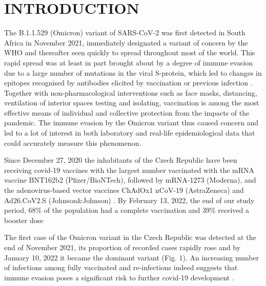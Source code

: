 \documentclass[a4paper,12pt]{article}
\def\figdiscrim{1}
\begin{document}
\section*{INTRODUCTION}
\label{sec1}

\doublespacing


The B.1.1.529 (Omicron) variant of SARS-CoV-2 was first detected in South Africa in November 2021, immediately designated a variant of concern by the WHO \citep{who2021omicron} and  thereafter seen quickly to spread throughout most of the world. This rapid spread was at least in part brought about by a degree of immune evasion due to a large number of mutations in the viral S-protein, which led to changes in epitopes recognised by antibodies elicited by vaccination or previous infection \citep{mccallum2022}. Together with non-pharmacological interventions such as face masks, distancing, ventilation of interior spaces testing and isolating, vaccination is among the most effective means of individual and collective protection from the impacts of the pandemic. The immune evasion by the Omicron variant thus caused concern and led to a lot of interest in both laboratory and real-life epidemiological data that could accurately measure this phenomenon.
\label{sec1}

Since December 27, 2020 the inhabitants of the Czech Republic have been receiving covid-19 vaccines with the largest number vaccinated with the mRNA vaccine BNT162b2 (Pfizer/BioNTech), followed by mRNA-1273 (Moderna), and the adenovirus-based vector vaccines ChAdOx1 nCoV-19 (AstraZeneca) and Ad26.CoV2.S (Johnson\&Johnson) \citep{mzcr}. By February 13, 2022, the end of our study period, 68\% of the population had a complete vaccination and 39\% received a booster dose  \citep{mzcr} 

The first case of the Omicron variant in the Czech Republic was detected at the end of November 2021, its proportion of recorded cases rapidly rose and by January 10, 2022 it became the dominant variant  (Fig. \figdiscrim). An increasing number of infections among fully vaccinated and re-infections indeed suggests that immune evasion poses a significant risk to further covid-19 development \citep{mzcr}. 
\end{document}
